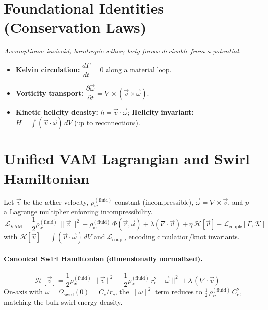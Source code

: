 \documentclass[11pt,a4paper]{article}
\newcommand{\aeFluid}{\rho_{\text{\ae}}^{(\text{fluid})}}
\newcommand{\Ce}{C_e}
\newcommand{\rc}{r_c}
\newcommand{\Lag}{\mathcal{L}}
\newcommand{\Ham}{\mathcal{H}}
\newcommand{\Om}{\Omega_{\text{swirl}}}
\begin{document}
    \section{Foundational Identities (Conservation Laws)}
    \label{sec:foundational-identities}
    \textit{Assumptions: inviscid, barotropic æther; body forces derivable from a potential.}
    \begin{itemize}
        \item \textbf{Kelvin circulation:} $\dfrac{d\Gamma}{dt} = 0$ along a material loop. \cite{Kelvin1869,Helmholtz1858}
        \item \textbf{Vorticity transport:} $\dfrac{\partial\vec{\omega}}{\partial t} = \nabla \times (\vec{v} \times \vec{\omega})$.
        \item \textbf{Kinetic helicity density:} $h = \vec{v} \cdot \vec{\omega}$; \textbf{Helicity invariant:} $H = \int (\vec{v} \cdot \vec{\omega})\,dV$ (up to reconnections). \cite{Moffatt1969}
    \end{itemize}

    \section{Unified VAM Lagrangian and Swirl Hamiltonian}
    \label{sec:lagrangian}
    Let $\vec v$ be the æther velocity, $\aeFluid$ constant (incompressible), $\vec\omega=\nabla\times\vec v$, and $p$ a Lagrange multiplier enforcing incompressibility.
    \[
        \boxed{\, \Lag_{\text{VAM}} =
            \frac{1}{2}\aeFluid\,\lVert\vec v\rVert^{2}
            - \aeFluid\,\Phi(\vec r,\vec\omega)
            + \lambda(\nabla\cdot\vec v)
            + \eta\,\mathcal{H}[\vec v]
            + \mathcal{L}_{\text{couple}}[\Gamma,\mathcal{K}] \,}
    \]
    with $\mathcal{H}[\vec v] = \int (\vec v\cdot\vec\omega)\,dV$ and $\mathcal{L}_{\text{couple}}$ encoding circulation/knot invariants.

    \paragraph{Canonical Swirl Hamiltonian (dimensionally normalized).}
    \[
        \boxed{\, \Ham[\vec v] =
            \frac{1}{2}\aeFluid\,\lVert\vec v\rVert^{2}
            + \frac{1}{2}\aeFluid\,\rc^{2}\,\lVert\vec\omega\rVert^{2}
            + \lambda\,(\nabla\cdot\vec v) \,}
    \]
    On-axis with $\omega=\Om(0)=\Ce/\rc$, the $\lVert\omega\rVert^2$ term reduces to $\tfrac12\,\aeFluid\,\Ce^2$, matching the bulk swirl energy density. \cite{Batchelor1967,LandauFluids}
\end{document}
